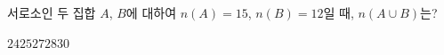 서로소인 두 집합 $A$, $B$에 대하여 $n(A)=15$, $n(B)=12$일 때, $n(A\cup B)$는?
\begin{choices32}{$24$}{$25$}{$27$}{$28$}{$30$}\end{choices32}
